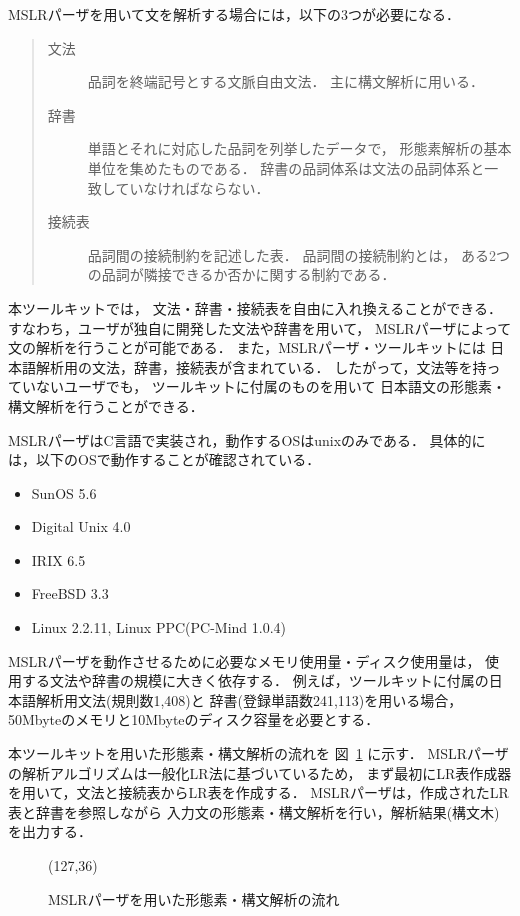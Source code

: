 MSLRパーザを用いて文を解析する場合には，以下の3つが必要になる．
\begin{quote}
  \begin{description}
  \item[文法　] 
    品詞を終端記号とする文脈自由文法．
    主に構文解析に用いる．

  \item[辞書　]
    単語とそれに対応した品詞を列挙したデータで，
    形態素解析の基本単位を集めたものである．
    辞書の品詞体系は文法の品詞体系と一致していなければならない．

  \item[接続表]
    品詞間の接続制約を記述した表．
    品詞間の接続制約とは，
    ある2つの品詞が隣接できるか否かに関する制約である．
  \end{description}
\end{quote}
本ツールキットでは，
文法・辞書・接続表を自由に入れ換えることができる．
すなわち，ユーザが独自に開発した文法や辞書を用いて，
MSLRパーザによって文の解析を行うことが可能である．
また，MSLRパーザ・ツールキットには
日本語解析用の文法，辞書，接続表が含まれている．
したがって，文法等を持っていないユーザでも，
ツールキットに付属のものを用いて
日本語文の形態素・構文解析を行うことができる．

MSLRパーザはC言語で実装され，動作するOSはunixのみである．
具体的には，以下のOSで動作することが確認されている．
\begin{itemize}
\item SunOS 5.6
\item Digital Unix 4.0
\item IRIX 6.5
\item FreeBSD 3.3
\item Linux 2.2.11, Linux PPC(PC-Mind 1.0.4)
\end{itemize}
MSLRパーザを動作させるために必要なメモリ使用量・ディスク使用量は，
使用する文法や辞書の規模に大きく依存する．
例えば，ツールキットに付属の日本語解析用文法(規則数1,408)と
辞書(登録単語数241,113)を用いる場合，
50Mbyteのメモリと10Mbyteのディスク容量を必要とする．

本ツールキットを用いた形態素・構文解析の流れを
図~\ref{fig:overview} に示す．
MSLRパーザの解析アルゴリズムは一般化LR法に基づいているため，
まず最初にLR表作成器を用いて，文法と接続表からLR表を作成する．
MSLRパーザは，作成されたLR表と辞書を参照しながら
入力文の形態素・構文解析を行い，解析結果(構文木)を出力する．

\begin{figure}[htbp]
  \begin{center}
    \begin{epsf}
    \end{epsf}
    \begin{draft}
    \atari(127,36)
    \end{draft}
    \caption{MSLRパーザを用いた形態素・構文解析の流れ}
    \label{fig:overview}
  \end{center}
\end{figure}

